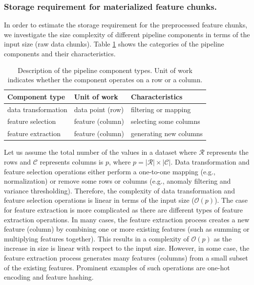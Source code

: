 \subsubsection{Storage requirement for materialized feature chunks.} 
In order to estimate the storage requirement for the preprocessed feature chunks, we investigate the size complexity of different pipeline components in terms of the input size (raw data chunks).
Table \ref{pipeline-component-description} shows the categories of the pipeline components and their characteristics.
\begin{table}[h!]
\centering
\begin{tabular}{lll}
\hline
\textbf{Component type}  & \textbf{Unit of work} &\textbf{Characteristics}  \\
\hline
data transformation			& data point (row)       	  & filtering or mapping        \\
feature selection            & feature (column)             & selecting some columns\\
feature extraction & feature (column) & generating new columns \\
\hline
\end{tabular}
\caption{Description of the pipeline component types. Unit of work indicates whether the component operates on a row or a column.}  
 \vspace{-32pt}
\label{pipeline-component-description}
\end{table}
Let us assume the total number of the values in a dataset where $\mathcal{R}$ represents the rows and $\mathcal{C}$ represents columns is $p$, where $p = |\mathcal{R}| \times |\mathcal{C}|$.
Data transformation and feature selection operations either perform a one-to-one mapping (e.g., normalization) or remove some rows or columns (e.g., anomaly filtering and variance thresholding).
Therefore, the complexity of data transformation and feature selection operations is linear in terms of the input size ($\mathcal{O}(p)$).
The case for feature extraction is more complicated as there are different types of feature extraction operations.
In many cases, the feature extraction process creates a new feature (column) by combining one or more existing features (such as summing or multiplying features together).
This results in a complexity of $\mathcal{O}(p)$ as the increase in size is linear with respect to the input size.
However, in some case, the feature extraction process generates many features (columns) from a small subset of the existing features.
Prominent examples of such operations are one-hot encoding and feature hashing.
